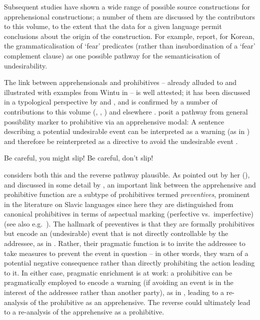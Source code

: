 \documentclass[output=paper,colorlinks,citecolor=brown
]{langscibook}
\begin{document}
Subsequent studies have shown a wide range of possible source constructions for apprehensional constructions; a number of them are discussed by the contributors to this volume, to the extent that the data for a given language permit conclusions about the origin of the construction. For example, \citet{chapters/rhee-kuteva} report, for Korean, the grammaticalisation of `fear' predicates (rather than insubordination of a `fear' complement clause) as one possible pathway for the semanticisation of undesirability.

The link between apprehensionals and prohibitives -- already alluded to and illustrated with examples from Wintu in  -- is well attested; it has been discussed in a typological perspective by \citet[50--63]{Dobrushina2006} and \citet{pakendorfschalley2007}, and is confirmed by a number of contributions to this volume (\citeauthor{chapters/lahaussois}, \citeauthor{chapters/treis}, \citeauthor{chapters/wiemer}) and elsewhere \citep{smithdennis2021}. \citet{pakendorfschalley2007} posit a pathway from general possibility marker to prohibitive via an apprehensive modal: A sentence describing a potential undesirable event can be interpreted as a warning (as in ) and therefore be reinterpreted as a directive to avoid the undesirable event .


\ea\label{ex:intro25}
\ea\label{ex:intro25a} {\op}Be careful,{\cp} you might slip!
\ex\label{ex:intro25b} {\op}Be careful,{\cp} don't slip!
\z
\z

 \citet[62]{Dobrushina2006} considers both this and the reverse pathway plausible. As pointed out by her (\citeyear[61--63]{Dobrushina2006}), and discussed in some detail by \citet{chapters/wiemer}, an important link between the apprehensive and prohibitive function are a subtype of prohibitives termed \textit{preventives}, prominent in the literature on Slavic languages since here they are distinguished from canonical prohibitives in terms of aspectual marking (perfective vs.\ imperfective) (see also e.g.\ \cite{Xrakovskij1990,kuehnast2008}). The hallmark of preventives is that they are formally prohibitives but encode an (undesirable) event that is not directly controllable by the addressee, as in . Rather, their pragmatic function is to invite the addressee to take measures to prevent the event in question -- in other words, they warn of a potential negative consequence rather than directly prohibiting the action leading to it. In either case, pragmatic enrichment is at work: a prohibitive can be pragmatically employed to encode a warning (if avoiding an event is in the interest of the addressee rather than another party), as in , leading to a re-analysis of the prohibitive as an apprehensive. The reverse could ultimately lead to a re-analysis of the apprehensive as a prohibitive. 
\end{document}

